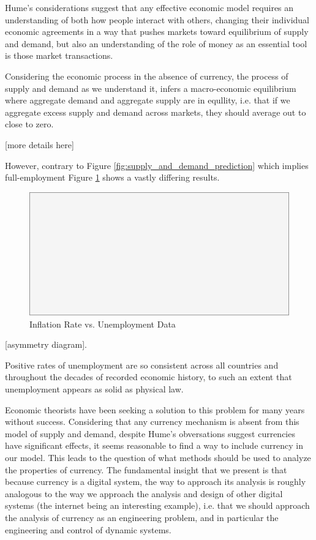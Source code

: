 Hume's considerations suggest that any effective economic model requires an understanding of both
how people interact with others, changing their individual economic agreements in a way that pushes
markets toward equilibrium of supply and demand, but also an understanding of the role of money as
an essential tool is those market transactions.

Considering the economic process in the absence of currency, the process of supply and demand as we
understand it, infers a macro-economic equilibrium where aggregate demand and aggregate supply are
in equllity, i.e. that if we aggregate excess supply and demand across markets, they should average
out to close to zero.

[more details here]




However, contrary to Figure \ref{fig:supply_and_demand_prediction} which implies full-employment
Figure \ref{fig:ui_all_data} shows a vastly differing results.

\begin{figure}[H]
\centering
\includegraphics[scale=0.48]{blank}
\caption{Inflation Rate vs. Unemployment Data}
\label{fig:ui_all_data}
\end{figure}

[asymmetry diagram].

Positive rates of unemployment are so consistent across all countries and throughout the decades of
recorded economic history, to such an extent that unemployment appears as solid as physical law.

Economic theorists have been seeking a solution to this problem for many years without success.
Considering that any currency mechanism is absent from this model of supply and demand, despite
Hume's obversations suggest currencies have significant effects, it seems reasonable to find a way
to include currency in our model. This leads to the question of what methods should be used to
analyze the properties of currency. The fundamental insight that we present is that because currency
is a digital system, the way to approach its analysis is roughly analogous to the way we approach
the analysis and design of other digital systems (the internet being an interesting example), i.e.
that we should approach the analysis of currency as an engineering problem, and in particular the
engineering and control of dynamic systems. 

